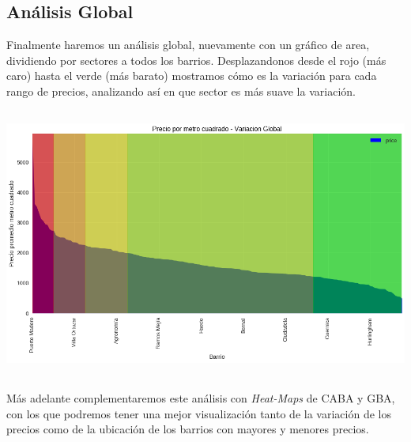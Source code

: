 \documentclass[a4paper, 10pt]{article}
\newcommand\tab[1][0.5cm]{\hspace*{#1}}
\begin{document}
			\subsection{Análisis Global}
				Finalmente haremos un análisis global, nuevamente con un gráfico de area, dividiendo por sectores a todos los
				barrios. Desplazandonos desde el rojo (más caro) hasta el verde (más barato) mostramos cómo es la variación para
				cada rango de precios, analizando así en que sector es más suave la variación.
				\begin{center}
    					\includegraphics[width=7in, height=3.5in]{images/m2GlobalVariation}
		  		\end{center}
				\tab Más adelante complementaremos este análisis con \emph{Heat-Maps} de CABA y GBA, con los que podremos
				tener una mejor visualización tanto de la variación de los precios como de la ubicación de los barrios 
				con mayores y menores precios. \\		
\end{document}
